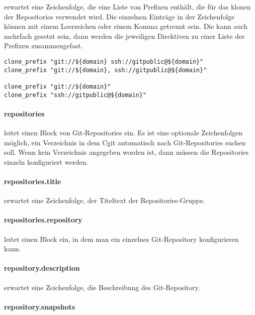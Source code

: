  erwartet eine Zeichenfolge, die eine Liste von
Prefixen enthält, die für das klonen der Repositories verwendet wird. Die
einzelnen Einträge in der Zeichenfolge können mit einem Leerzeichen oder einem
Komma getrennt sein. Die  kann auch mehrfach gesetzt
sein, dann werden die jeweiligen Direktiven zu einer Liste der Prefixen
zusammengefast.

\begin{lstlisting}[style=Java, caption=Beispiele für die
\directive{clone\_prefix}]
clone_prefix "git://${domain} ssh://gitpublic@${domain}"
clone_prefix "git://${domain}, ssh://gitpublic@${domain}"

clone_prefix "git://${domain}"
clone_prefix "ssh://gitpublic@${domain}"
\end{lstlisting}

\paragraph{repositories}

 leitet einen Block von Git-Repositories ein. Es ist
eine optionale Zeichenfolgen möglich, ein Verzeichnis in dem Cgit automatisch
nach Git-Repositories suchen soll. Wenn kein Verzeichnis angegeben worden ist,
dann müssen die Repositories einzeln konfiguriert werden.

\paragraph{repositories.title}

 erwartet eine Zeichenfolge, der Titeltext der
Repositories-Gruppe.

\paragraph{repositories.repository}

 leitet einen Block ein, in dem man ein einzelnes
Git-Repository konfigurieren kann.

\paragraph{repository.description}

 erwartet eine Zeichenfolge, die Beschreibung des
Git-Repository.

\paragraph{repository.snapshots}

